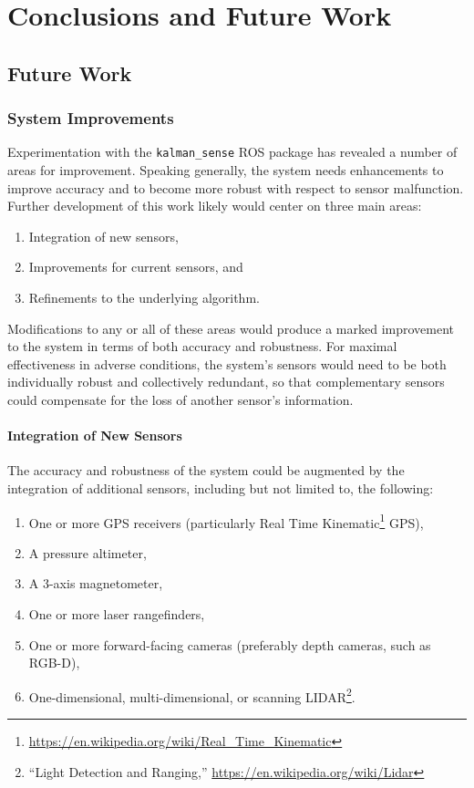 \chapter{Conclusions and Future Work}


\section{Future Work}

\subsection{System Improvements}

Experimentation with the \texttt{kalman\_sense} ROS package has revealed a number of areas for improvement. Speaking generally, the system needs enhancements to improve accuracy and to become more robust with respect to sensor malfunction. Further development of this work likely would center on three main areas:
\begin{enumerate}
    \item Integration of new sensors,
    \item Improvements for current sensors, and
    \item Refinements to the underlying algorithm.
\end{enumerate}
Modifications to any or all of these areas would produce a marked improvement to the system in terms of both accuracy and robustness. For maximal effectiveness in adverse conditions, the system's sensors would need to be both individually robust and collectively redundant, so that complementary sensors could compensate for the loss of another sensor's information.

\subsubsection{Integration of New Sensors}
The accuracy and robustness of the system could be augmented by the integration of additional sensors, including but not limited to, the following:
\begin{enumerate}
    \item One or more GPS receivers (particularly Real Time Kinematic\footnote{\url{https://en.wikipedia.org/wiki/Real_Time_Kinematic}} GPS),
    \item A pressure altimeter,
    \item A 3-axis magnetometer,
    \item One or more laser rangefinders,
    \item One or more forward-facing cameras (preferably depth cameras, such as RGB-D),
    \item One-dimensional, multi-dimensional, or scanning LIDAR\footnote{``Light Detection and Ranging,'' \url{https://en.wikipedia.org/wiki/Lidar}}.
\end{enumerate}


